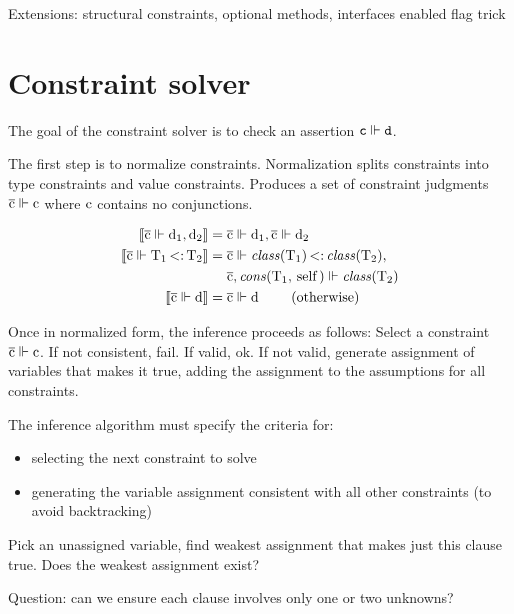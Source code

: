 \documentclass[preprint,nocopyrightspace,9pt]{sigplanconf}
\begin{document}
Extensions: structural constraints, optional methods, interfaces
        enabled flag trick


\section{Constraint solver}

The goal of the constraint solver is 
to check an assertion ${\tt c} \vdashC {\tt d}$.

The first step is to normalize constraints.
Normalization splits constraints into type constraints and
value constraints.  Produces a set of constraint judgments
$\xbar{c} \vdashC \Xcd{c}$ where $\Xcd{c}$ contains no conjunctions.

\begin{align*}
\SB{ \xbar{c} \vdashC \Xcd{d}_1, \Xcd{d}_2 } 
        &=
     \xbar{c} \vdashC \Xcd{d}_1,
     \xbar{c} \vdashC \Xcd{d}_2
     \\
\SB{ \xbar{c} \vdashC \Xcd{T}_1 \subtype \Xcd{T}_2 } 
        &=
     \xbar{c} \vdashC \class{\Xcd{T}_1}{\Xcd{self}} \subtype \class{\Xcd{T}_2}{\Xcd{self}}, \\
     & \quad~
     \xbar{c}, \cons{\Xcd{T}_1}{\Xcd{self}} \vdashC \class{\Xcd{T}_2}{\Xcd{self}}
     \\
\SB{ \xbar{c} \vdashC \Xcd{d} }
        &=
     \xbar{c} \vdashC \Xcd{d}
     \qquad~\mbox{(otherwise)}
     \\
\end{align*}

Once in normalized form, the inference proceeds as follows:
Select a constraint $\xbar{c} \vdashC \Xcd{c}$.
If not consistent, fail.
If valid, ok.
If not valid, generate assignment of variables that makes it
true, adding the assignment to the assumptions for all
constraints.

The inference algorithm must specify the criteria for:
\begin{itemize}
\item selecting the next constraint to solve
\item generating the variable assignment consistent with all
other constraints (to avoid backtracking)
\end{itemize}

Pick an unassigned variable, find weakest assignment that makes just
this clause true.  Does the weakest assignment exist?

Question: can we ensure each clause involves only one or two
unknowns?
\end{document}
